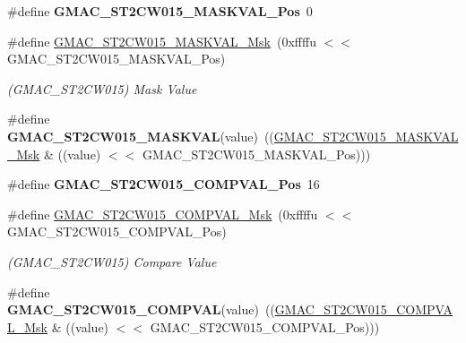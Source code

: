 \begin{DoxyCompactItemize}
\#define {\bfseries G\+M\+A\+C\+\_\+\+S\+T2\+C\+W015\+\_\+\+M\+A\+S\+K\+V\+A\+L\+\_\+\+Pos}~0
\item 
\mbox{\label{group__SAME70__GMAC_ga3859605b762f911e585c5ca2de5ccd8a}} 
\#define \mbox{\hyperlink{group__SAME70__GMAC_ga3859605b762f911e585c5ca2de5ccd8a}{G\+M\+A\+C\+\_\+\+S\+T2\+C\+W015\+\_\+\+M\+A\+S\+K\+V\+A\+L\+\_\+\+Msk}}~(0xffffu $<$$<$ G\+M\+A\+C\+\_\+\+S\+T2\+C\+W015\+\_\+\+M\+A\+S\+K\+V\+A\+L\+\_\+\+Pos)
\begin{DoxyCompactList}\small\item\em (G\+M\+A\+C\+\_\+\+S\+T2\+C\+W015) Mask Value \end{DoxyCompactList}\item 
\mbox{\label{group__SAME70__GMAC_gaae8bae1013be67c662d5996bb0897e97}} 
\#define {\bfseries G\+M\+A\+C\+\_\+\+S\+T2\+C\+W015\+\_\+\+M\+A\+S\+K\+V\+AL}(value)~((\mbox{\hyperlink{group__SAMV71__GMAC_ga3859605b762f911e585c5ca2de5ccd8a}{G\+M\+A\+C\+\_\+\+S\+T2\+C\+W015\+\_\+\+M\+A\+S\+K\+V\+A\+L\+\_\+\+Msk}} \& ((value) $<$$<$ G\+M\+A\+C\+\_\+\+S\+T2\+C\+W015\+\_\+\+M\+A\+S\+K\+V\+A\+L\+\_\+\+Pos)))
\item 
\mbox{\label{group__SAME70__GMAC_ga99edb2b8d833cd453cda522eece1e6b2}} 
\#define {\bfseries G\+M\+A\+C\+\_\+\+S\+T2\+C\+W015\+\_\+\+C\+O\+M\+P\+V\+A\+L\+\_\+\+Pos}~16
\item 
\mbox{\label{group__SAME70__GMAC_ga979e875d564a55e8bbdcc51665201786}} 
\#define \mbox{\hyperlink{group__SAME70__GMAC_ga979e875d564a55e8bbdcc51665201786}{G\+M\+A\+C\+\_\+\+S\+T2\+C\+W015\+\_\+\+C\+O\+M\+P\+V\+A\+L\+\_\+\+Msk}}~(0xffffu $<$$<$ G\+M\+A\+C\+\_\+\+S\+T2\+C\+W015\+\_\+\+C\+O\+M\+P\+V\+A\+L\+\_\+\+Pos)
\begin{DoxyCompactList}\small\item\em (G\+M\+A\+C\+\_\+\+S\+T2\+C\+W015) Compare Value \end{DoxyCompactList}\item 
\mbox{\label{group__SAME70__GMAC_ga5b88618ac1e3ec534b6771360151157b}} 
\#define {\bfseries G\+M\+A\+C\+\_\+\+S\+T2\+C\+W015\+\_\+\+C\+O\+M\+P\+V\+AL}(value)~((\mbox{\hyperlink{group__SAMV71__GMAC_ga979e875d564a55e8bbdcc51665201786}{G\+M\+A\+C\+\_\+\+S\+T2\+C\+W015\+\_\+\+C\+O\+M\+P\+V\+A\+L\+\_\+\+Msk}} \& ((value) $<$$<$ G\+M\+A\+C\+\_\+\+S\+T2\+C\+W015\+\_\+\+C\+O\+M\+P\+V\+A\+L\+\_\+\+Pos)))

\end{DoxyCompactItemize}
